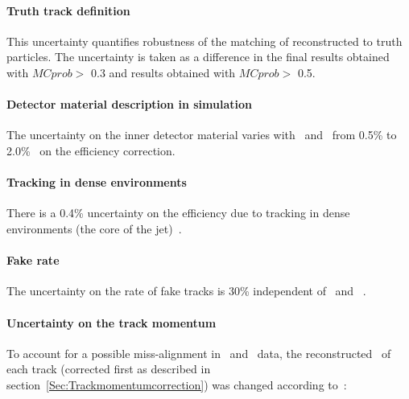 
\paragraph{Truth track definition}  
This uncertainty quantifies robustness of the matching of reconstructed to truth particles.
The uncertainty is taken as a difference in the final results obtained with  $MCprob>$ 0.3 
and results obtained with $MCprob>$ 0.5. 


\paragraph{Detector material description in simulation}
The uncertainty on the inner detector material
varies with \pttrk\ and \etatrk\ from 0.5\% to 2.0\%~\cite{ref:tracktwiki} on the efficiency correction.  


\paragraph{Tracking in dense environments}
There is a 0.4\% uncertainty on the efficiency due to tracking in dense environments (the core of the jet)~\cite{ref:tracktwiki}.


\paragraph{Fake rate}
The uncertainty on the rate of fake tracks is 30\% independent of \pttrk\ and \etatrk~\cite{ref:tracktwiki}. 

\paragraph{Uncertainty on the track momentum}
To account for a possible miss-alignment in \pp\ and \PbPb\ data, the reconstructed \pT\ of each track (corrected first as described in section~\ref{Sec:Trackmomentumcorrection}) was changed according to~\cite{TrackingRec}:

